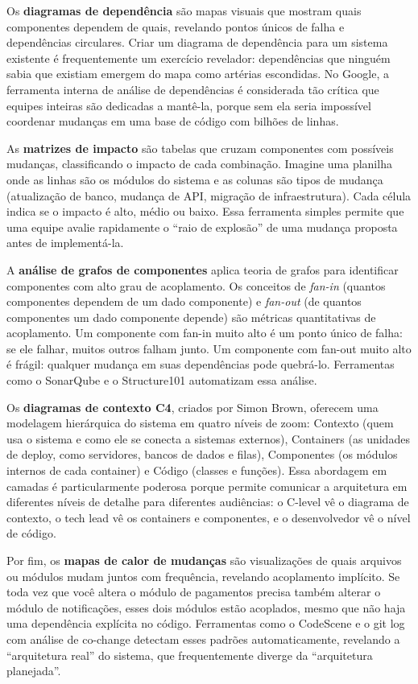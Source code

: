 Os \textbf{diagramas de dependência} são mapas visuais que mostram quais
componentes dependem de quais, revelando pontos únicos de falha e
dependências circulares. Criar um diagrama de dependência para um sistema
existente é frequentemente um exercício revelador: dependências que
ninguém sabia que existiam emergem do mapa como artérias escondidas. No
Google, a ferramenta interna de análise de dependências é considerada
tão crítica que equipes inteiras são dedicadas a mantê-la, porque sem
ela seria impossível coordenar mudanças em uma base de código com
bilhões de linhas.

As \textbf{matrizes de impacto} são tabelas que cruzam componentes com
possíveis mudanças, classificando o impacto de cada combinação. Imagine
uma planilha onde as linhas são os módulos do sistema e as colunas são
tipos de mudança (atualização de banco, mudança de API, migração de
infraestrutura). Cada célula indica se o impacto é alto, médio ou baixo.
Essa ferramenta simples permite que uma equipe avalie rapidamente o
``raio de explosão'' de uma mudança proposta antes de implementá-la.

A \textbf{análise de grafos de componentes} aplica teoria de grafos para
identificar componentes com alto grau de acoplamento. Os conceitos de
\emph{fan-in} (quantos componentes dependem de um dado componente) e
\emph{fan-out} (de quantos componentes um dado componente depende) são
métricas quantitativas de acoplamento. Um componente com fan-in muito
alto é um ponto único de falha: se ele falhar, muitos outros falham
junto. Um componente com fan-out muito alto é frágil: qualquer mudança
em suas dependências pode quebrá-lo. Ferramentas como o SonarQube e o
Structure101 automatizam essa análise.

Os \textbf{diagramas de contexto C4}, criados por Simon Brown, oferecem
uma modelagem hierárquica do sistema em quatro níveis de zoom: Contexto
(quem usa o sistema e como ele se conecta a sistemas externos), Containers
(as unidades de deploy, como servidores, bancos de dados e filas), Componentes
(os módulos internos de cada container) e Código (classes e funções). Essa
abordagem em camadas é particularmente poderosa porque permite comunicar a
arquitetura em diferentes níveis de detalhe para diferentes audiências: o
C-level vê o diagrama de contexto, o tech lead vê os containers e
componentes, e o desenvolvedor vê o nível de código.

Por fim, os \textbf{mapas de calor de mudanças} são visualizações de
quais arquivos ou módulos mudam juntos com frequência, revelando
acoplamento implícito. Se toda vez que você altera o módulo de
pagamentos precisa também alterar o módulo de notificações, esses dois
módulos estão acoplados, mesmo que não haja uma dependência explícita
no código. Ferramentas como o CodeScene e o git log com análise de
co-change detectam esses padrões automaticamente, revelando a
``arquitetura real'' do sistema, que frequentemente diverge da
``arquitetura planejada''.


